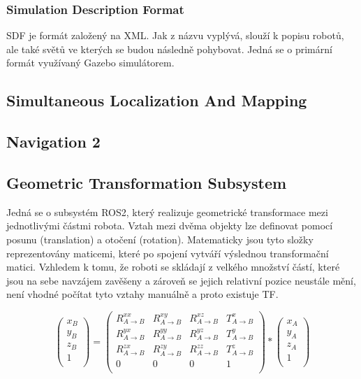\subsubsection*{Simulation Description Format}
SDF je formát založený na XML. Jak z názvu vyplývá, slouží k popisu robotů, ale také světů ve kterých se budou následně pohybovat. Jedná se o primární formát využívaný Gazebo simulátorem.


\subsection{Simultaneous Localization And Mapping}

\subsection{Navigation 2}

\subsection{Geometric Transformation Subsystem}
Jedná se o subsystém ROS2, který realizuje geometrické transformace mezi jednotlivými částmi robota.
Vztah mezi dvěma objekty lze definovat pomocí posunu (translation) a otočení (rotation). Matematicky jsou tyto složky reprezentovány maticemi, které po spojení vytváří výslednou transformační matici. Vzhledem k tomu, že roboti se skládají z velkého množství částí, které jsou na sebe navzájem zavěšeny a zároveň se jejich relativní pozice neustále mění, není vhodné počítat tyto vztahy manuálně a proto existuje TF.


$$
\begin{pmatrix}
	x_B\\
	y_B\\
	z_B\\
	1\\
\end{pmatrix}
=
\begin{pmatrix}
	R_{A\rightarrow B}^{xx} & R_{A\rightarrow B}^{xy} & R_{A\rightarrow B}^{xz} & T_{A\rightarrow B}^x\\
	R_{A\rightarrow B}^{yx} & R_{A\rightarrow B}^{yy} & R_{A\rightarrow B}^{yz} & T_{A\rightarrow B}^y\\
	R_{A\rightarrow B}^{zx} & R_{A\rightarrow B}^{zy} & R_{A\rightarrow B}^{zz} & T_{A\rightarrow B}^z\\
	0 & 0 & 0 & 1\\
\end{pmatrix}
*
\begin{pmatrix}
	x_A\\
	y_A\\
	z_A\\
	1\\
\end{pmatrix}
$$

